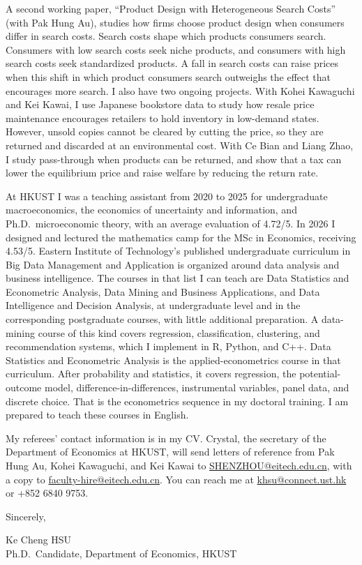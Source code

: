 \documentclass[11pt]{article}
\begin{document}
A second working paper, ``Product Design with Heterogeneous Search Costs'' (with Pak Hung Au), studies how firms choose product design when consumers differ in search costs. Search costs shape which products consumers search. Consumers with low search costs seek niche products, and consumers with high search costs seek standardized products. A fall in search costs can raise prices when this shift in which product consumers search outweighs the effect that encourages more search. I also have two ongoing projects. With Kohei Kawaguchi and Kei Kawai, I use Japanese bookstore data to study how resale price maintenance encourages retailers to hold inventory in low-demand states. However, unsold copies cannot be cleared by cutting the price, so they are returned and discarded at an environmental cost. With Ce Bian and Liang Zhao, I study pass-through when products can be returned, and show that a tax can lower the equilibrium price and raise welfare by reducing the return rate.

At HKUST I was a teaching assistant from 2020 to 2025 for undergraduate macroeconomics, the economics of uncertainty and information, and Ph.D.\ microeconomic theory, with an average evaluation of 4.72/5. In 2026 I designed and lectured the mathematics camp for the MSc in Economics, receiving 4.53/5. Eastern Institute of Technology's published undergraduate curriculum in Big Data Management and Application is organized around data analysis and business intelligence. The courses in that list I can teach are Data Statistics and Econometric Analysis, Data Mining and Business Applications, and Data Intelligence and Decision Analysis, at undergraduate level and in the corresponding postgraduate courses, with little additional preparation. A data-mining course of this kind covers regression, classification, clustering, and recommendation systems, which I implement in R, Python, and C++. Data Statistics and Econometric Analysis is the applied-econometrics course in that curriculum. After probability and statistics, it covers regression, the potential-outcome model, difference-in-differences, instrumental variables, panel data, and discrete choice. That is the econometrics sequence in my doctoral training. I am prepared to teach these courses in English.

My referees' contact information is in my CV. Crystal, the secretary of the Department of Economics at HKUST, will send letters of reference from Pak Hung Au, Kohei Kawaguchi, and Kei Kawai to \href{mailto:SHENZHOU@eitech.edu.cn}{SHENZHOU@eitech.edu.cn}, with a copy to \href{mailto:faculty-hire@eitech.edu.cn}{faculty-hire@eitech.edu.cn}. You can reach me at \href{mailto:khsu@connect.ust.hk}{khsu@connect.ust.hk} or +852 6840 9753.

\vspace{0.05em}
Sincerely,

\vspace{0.05em}
Ke Cheng HSU \\
Ph.D.\ Candidate, Department of Economics, HKUST
\end{document}
